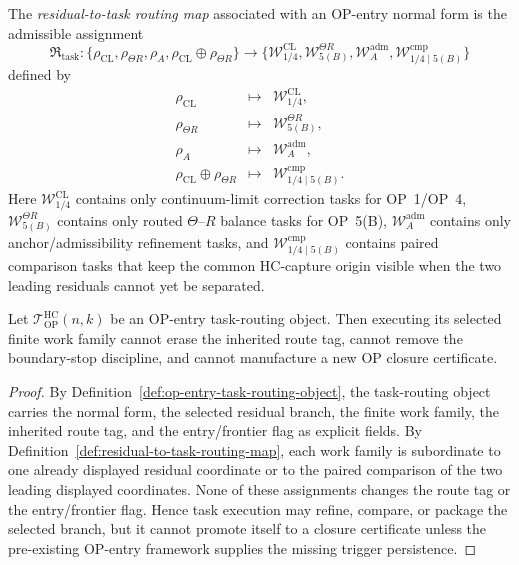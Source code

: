 \begin{definition}
\label{def:residual-to-task-routing-map}
The \emph{residual-to-task routing map} associated with an OP-entry normal form is the admissible assignment
\[
 \mathfrak R_{\mathrm{task}}
 :
 \{\rho_{\mathrm{CL}},\rho_{\Theta R},\rho_A,
 \rho_{\mathrm{CL}}\oplus\rho_{\Theta R}\}
 \longrightarrow
 \{\mathcal W_{1/4}^{\mathrm{CL}},
 \mathcal W_{5(B)}^{\Theta R},
 \mathcal W_A^{\mathrm{adm}},
 \mathcal W_{1/4\mid 5(B)}^{\mathrm{cmp}}
 \}
\]
defined by
\[
\begin{array}{rcl}
 \rho_{\mathrm{CL}} &\longmapsto&
 \mathcal W_{1/4}^{\mathrm{CL}},\\[0.25em]
 \rho_{\Theta R} &\longmapsto&
 \mathcal W_{5(B)}^{\Theta R},\\[0.25em]
 \rho_A &\longmapsto&
 \mathcal W_A^{\mathrm{adm}},\\[0.25em]
 \rho_{\mathrm{CL}}\oplus\rho_{\Theta R} &\longmapsto&
 \mathcal W_{1/4\mid 5(B)}^{\mathrm{cmp}}.
\end{array}
\]
Here $\mathcal W_{1/4}^{\mathrm{CL}}$ contains only continuum-limit correction tasks for OP~1/OP~4, $\mathcal W_{5(B)}^{\Theta R}$ contains only routed $\Theta$--$R$ balance tasks for OP~5(B), $\mathcal W_A^{\mathrm{adm}}$ contains only anchor/admissibility refinement tasks, and $\mathcal W_{1/4\mid 5(B)}^{\mathrm{cmp}}$ contains paired comparison tasks that keep the common HC-capture origin visible when the two leading residuals cannot yet be separated.
\end{definition}

\begin{lemma}
\label{lem:task-routing-preserves-op-entry-normal-form-discipline}
Let $\mathcal T_{\mathrm{OP}}^{\mathrm{HC}}(n,k)$ be an OP-entry task-routing object. Then executing its selected finite work family cannot erase the inherited route tag, cannot remove the boundary-stop discipline, and cannot manufacture a new OP closure certificate.
\end{lemma}

\begin{proof}
By Definition~\ref{def:op-entry-task-routing-object}, the task-routing object carries the normal form, the selected residual branch, the finite work family, the inherited route tag, and the entry/frontier flag as explicit fields. By Definition~\ref{def:residual-to-task-routing-map}, each work family is subordinate to one already displayed residual coordinate or to the paired comparison of the two leading displayed coordinates. None of these assignments changes the route tag or the entry/frontier flag. Hence task execution may refine, compare, or package the selected branch, but it cannot promote itself to a closure certificate unless the pre-existing OP-entry framework supplies the missing trigger persistence.
\end{proof}

